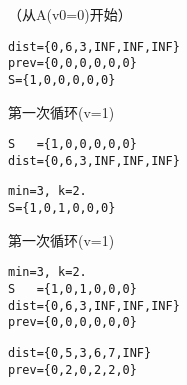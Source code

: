 \begin{frame}[fragile]\ft{\subsubsecname}
\begin{figure}
\centering

\end{figure}
\end{frame}



\begin{frame}[fragile]\ft{\subsubsecname}

（从A(v0=0)开始）


\begin{lstlisting}
dist={0,6,3,INF,INF,INF}
prev={0,0,0,0,0,0}
S={1,0,0,0,0,0}
\end{lstlisting}

\end{frame}


\begin{frame}[fragile]\ft{\subsubsecname}

\tf 第一次循环(v=1) 
\begin{lstlisting}
S   ={1,0,0,0,0,0}
dist={0,6,3,INF,INF,INF}
\end{lstlisting}




\begin{lstlisting}
min=3, k=2.
S={1,0,1,0,0,0}
\end{lstlisting}

\end{frame}


\begin{frame}[fragile]\ft{\subsubsecname}

\tf 第一次循环(v=1)
\begin{lstlisting}
min=3, k=2.
S   ={1,0,1,0,0,0}
dist={0,6,3,INF,INF,INF}
prev={0,0,0,0,0,0}
\end{lstlisting}



\begin{lstlisting}
dist={0,5,3,6,7,INF}
prev={0,2,0,2,2,0}
\end{lstlisting}

\end{frame}


